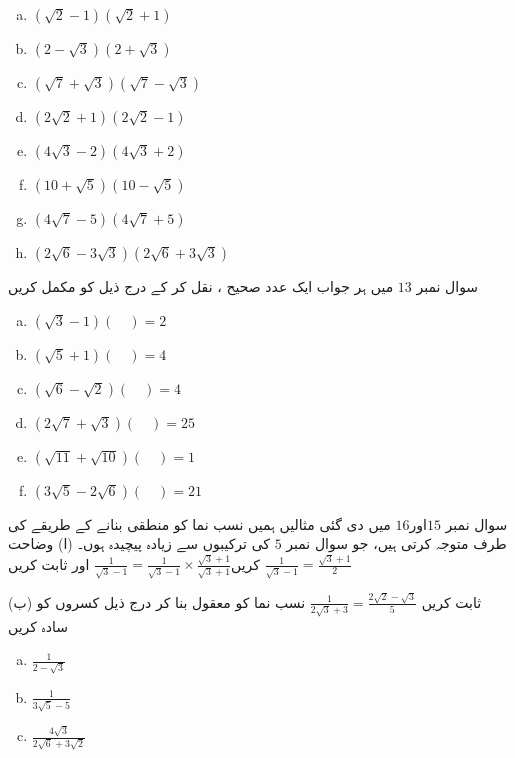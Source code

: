 \begin{multicols}{3}
\begin{enumerate}[a.]
\item
\((\sqrt{2}-1)(\sqrt{2}+1)\)
\item
\((2-\sqrt{3})(2+\sqrt{3})\)
\item
\((\sqrt{7}+\sqrt{3})(\sqrt{7}-\sqrt{3})\)
\item
\((2\sqrt{2}+1)(2\sqrt{2}-1)\)
\item
\((4\sqrt{3}-2)(4\sqrt{3}+2)\)
\item
\((10+\sqrt{5})(10-\sqrt{5})\)
\item
\((4\sqrt{7}-5)(4\sqrt{7}+5)\)
\item
\((2\sqrt{6}-3\sqrt{3})(2\sqrt{6}+3\sqrt{3})\)
\end{enumerate}
\end{multicols}
سوال نمبر \(13\) میں ہر جواب ایک عدد صحیح ، نقل کر کے درج ذیل کو مکمل کریں
\begin{multicols}{2}
\begin{enumerate}[a.]
\item
\((\sqrt{3}-1)(\quad )=2\)
\item
\((\sqrt{5}+1)(\quad)=4\)
\item
\((\sqrt{6}-\sqrt{2})(\quad)=4\)
\item
\((2\sqrt{7}+\sqrt{3})(\quad)=25\)
\item
\((\sqrt{11}+\sqrt{10})(\quad)=1\)
\item
\((3\sqrt{5}-2\sqrt{6})(\quad)=21\)
\end{enumerate}
\end{multicols}
سوال نمبر \(15\)اور\(16\) میں دی گئی مثالیں ہمیں نسب نما کو منطقی بنانے کے طریقے کی طرف متوجہ کرتی ہیں، جو سوال نمبر \(5\) کی ترکیبوں سے زیادہ پیچیدہ ہوں۔
(ا) وضاحت کریں\(\frac{1}{\sqrt{3}-1}=\frac{1}{\sqrt{3}-1}\times\frac{\sqrt{3}+1}{\sqrt{3}+1}\) اور ثابت کریں \(\frac{1}{\sqrt{3}-1}=\frac{\sqrt{3}+1}{2}\)

(ب) ثابت کریں \(\frac{1}{2\sqrt{3}+3}=\frac{2\sqrt{2}-\sqrt{3}}{5}\)
نسب نما کو معقول بنا کر درج ذیل کسروں کو سادہ کریں
\begin{multicols}{3}
\begin{enumerate}[a.]
\item
\(\frac{1}{2-\sqrt{3}}\)
\item
\(\frac{1}{3\sqrt{5}-5}\)
\item
\(\frac{4\sqrt{3}}{2\sqrt{6}+3\sqrt{2}}\)
\end{enumerate}
\end{multicols}

